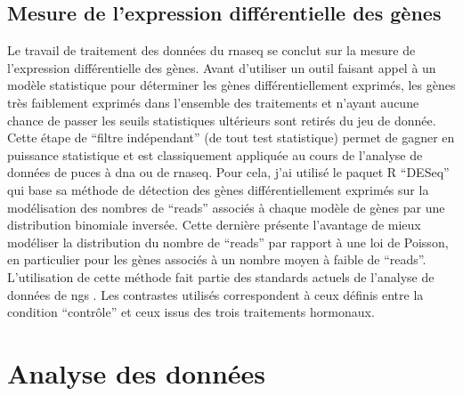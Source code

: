 \documentclass[../main.tex]{subfiles}
\begin{document}
\subsection{Mesure de l'expression différentielle des gènes}\label{subsec:diff-expr-call}
Le travail de traitement des données du \gls{rnaseq} se conclut sur la mesure de l'expression différentielle des gènes.
Avant d'utiliser un outil faisant appel à un modèle statistique pour déterminer les gènes différentiellement exprimés, les gènes très faiblement exprimés dans l'ensemble des traitements et n'ayant aucune chance de passer les seuils statistiques ultérieurs sont retirés du jeu de donnée.
Cette étape de ``filtre indépendant'' (de tout test statistique) permet de gagner en puissance statistique et est classiquement appliquée au cours de l'analyse de données de puces à \gls{dna} ou de \gls{rnaseq}.
Pour cela, j'ai utilisé le paquet R ``DESeq'' \citep{Anders2010} qui base sa méthode de détection des gènes différentiellement exprimés sur la modélisation des nombres de ``reads'' associés à chaque modèle de gènes par une distribution binomiale inversée.
Cette dernière présente l'avantage de mieux modéliser la distribution du nombre de ``reads'' par rapport à une loi de Poisson, en particulier pour les gènes associés à un nombre moyen à faible de ``reads''.
L’utilisation de cette méthode fait partie des standards actuels de l’analyse de données de \gls{ngs} \citep{Anders2013}.
Les contrastes utilisés correspondent à ceux définis entre la condition ``contrôle'' et ceux issus des trois traitements hormonaux.


\section{Analyse des données}
\end{document}
